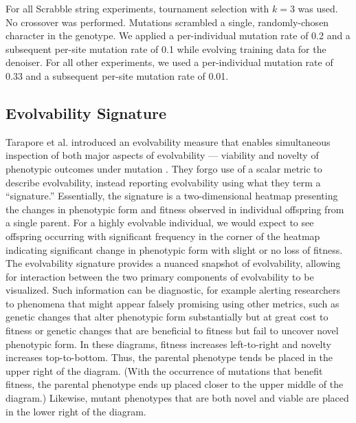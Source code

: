 For all Scrabble string experiments, tournament selection with $k = 3$ was used.
No crossover was performed.
Mutations scrambled a single, randomly-chosen character in the genotype.
We applied a per-individual mutation rate of 0.2 and a subsequent per-site mutation rate of 0.1 while evolving training data for the denoiser.
For all other experiments, we used a per-individual mutation rate of 0.33 and a subsequent per-site mutation rate of 0.01.

\subsection{Evolvability Signature}
Tarapore et al. introduced an evolvability measure that enables simultaneous inspection of both major aspects of evolvability --- viability and novelty of phenotypic outcomes under mutation \cite{tarapore2015evolvability}.
They forgo use of a scalar metric to describe evolvability, instead reporting evolvability using what they term a ``signature.''
Essentially, the signature is a two-dimensional heatmap presenting the changes in phenotypic form and fitness observed in individual offspring from a single parent.
For a highly evolvable individual, we would expect to see offspring occurring with significant frequency in the corner of the heatmap indicating significant change in phenotypic form with slight or no loss of fitness.
The evolvability signature provides a nuanced snapshot of evolvability, allowing for interaction between the two primary components of evolvability to be visualized.
Such information can be diagnostic, for example alerting researchers to phenomena that might appear falsely promising using other metrics, such as genetic changes that alter phenotypic form substantially but at great cost to fitness or genetic changes that are beneficial to fitness but fail to uncover novel phenotypic form.
In these diagrams, fitness increases left-to-right and novelty increases top-to-bottom.
Thus, the parental phenotype tends be placed in the upper right of the diagram.
(With the occurrence of mutations that benefit fitness, the parental phenotype ends up placed closer to the upper middle of the diagram.)
Likewise, mutant phenotypes that are both novel and viable are placed in the lower right of the diagram.
